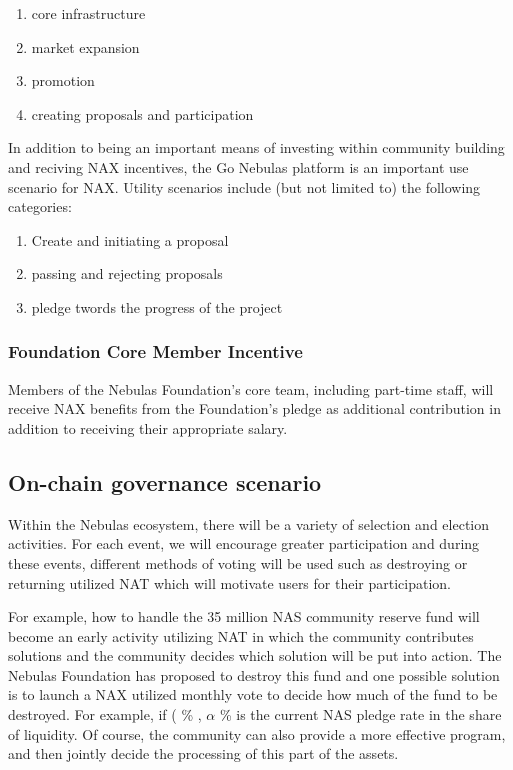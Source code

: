 \begin{enumerate}[\hspace{1cm}(a)]
  \item core infrastructure
  \item market expansion
  \item promotion
  \item creating proposals and participation
\end{enumerate}

In addition to being an important means of investing within community building and reciving NAX incentives, the Go Nebulas platform is an important use scenario for NAX. Utility scenarios include (but not limited to) the following categories:
\begin{enumerate}[\hspace{1cm}(a)]
  \item Create and initiating a proposal
  \item passing and rejecting proposals
  \item pledge twords the progress of the project
\end{enumerate}

\subsubsection{Foundation Core Member Incentive}
Members of the Nebulas Foundation's core team, including part-time staff, will receive NAX benefits from the Foundation's pledge as additional contribution in addition to receiving their appropriate salary.


\subsection{On-chain governance scenario}
Within the Nebulas ecosystem, there will be a variety of selection and election activities. For each event, we will encourage greater participation and during these events, different methods of voting will be used such as destroying or returning utilized NAT which will motivate users for their participation.

For example, how to handle the 35 million NAS community reserve fund will become an early activity utilizing NAT in which the community contributes solutions and the community decides which solution will be put into action. The Nebulas Foundation has proposed to destroy this fund and one possible solution is to launch a NAX utilized monthly vote to decide how much of the fund to be destroyed. For example, if (\alpha\) \% , \(\alpha\) \% is the current NAS pledge rate in the share of liquidity. Of course, the community can also provide a more effective program, and then jointly decide the processing of this part of the assets.

